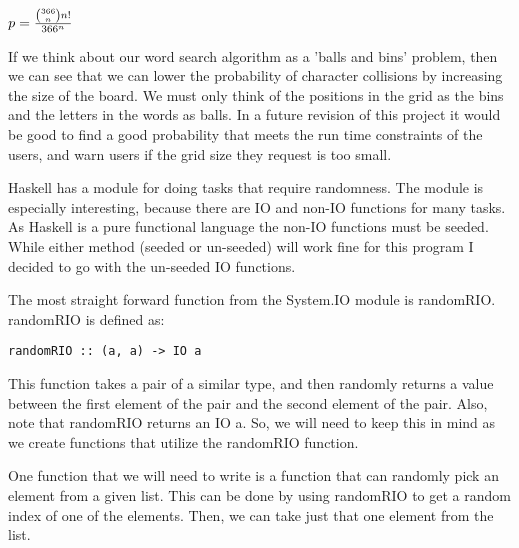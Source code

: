 \documentclass[12pt]{report}   %
\begin{document}
    \vspace{12pt}
    \begin{center}
        $ p = {{{366 \choose n} n!} \over {366^{n}}} $
    \end{center}

    \vspace{12pt}

    If we think about our word search algorithm as a 'balls and bins' problem,
    then we can see that we can lower the probability of character collisions
    by increasing the size of the board. We must only think of the positions in
    the grid as the bins and the letters in the words as balls. In a future
    revision of this project it would be good to find a good probability that 
    meets the run time constraints of the users, and warn users if the grid
    size they request is too small. \cite{prob}

    \vspace{12pt}

    Haskell has a module for doing tasks that require randomness. The module is
    especially interesting, because there are IO and non-IO functions for many
    tasks. As Haskell is a pure functional language the non-IO functions must
    be seeded. While either method (seeded or un-seeded) will work fine for
    this program I decided to go with the un-seeded IO functions.

    \vspace{12pt}

    The most straight forward function from the System.IO module is randomRIO.
    randomRIO is defined as:

    \vspace{12pt}

    \begin{lstlisting}
randomRIO :: (a, a) -> IO a
    \end{lstlisting}

    \vspace{12pt}

    This function takes a pair of a similar type, and then randomly returns
    a value between the first element of the pair and the second element of the
    pair. Also, note that randomRIO returns an IO a. So, we will need to keep
    this in mind as we create functions that utilize the randomRIO function.

    \vspace{12pt}

    One function that we will need to write is a function that can randomly
    pick an element from a given list. This can be done by using randomRIO to
    get a random index of one of the elements. Then, we can take just that one
    element from the list.
\end{document}
